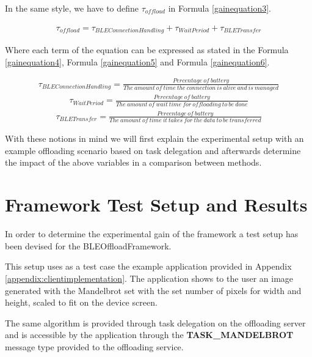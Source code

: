 In the same style, we have to define \(\tau_{offload}\) in Formula \ref{gainequation3}.

\begin{align}\label{gainequation3}
\tau_{offload} = \tau_{BLEConnectionHandling} + \tau_{WaitPeriod} + \tau_{BLETransfer}
\end{align}

Where each term of the equation can be expressed as stated in the Formula \ref{gainequation4}, Formula \ref{gainequation5} and Formula \ref{gainequation6}.

\begin{align}\label{gainequation4}
\tau_{BLEConnectionHandling} = \tfrac{Percentage\ of\ battery}{The\ amount\ of\ time\ the\ connection\ is\ alive\ and\ is\ managed} 
\end{align}
\begin{align}\label{gainequation5}
\tau_{WaitPeriod} = \tfrac{Percentage\ of\ battery}{The\ amount\ of\ wait\ time\ for\ offloading\ to\ be\ done} 
\end{align}
\begin{align}\label{gainequation6}
\tau_{BLETransfer} = \tfrac{Percentage\ of\ battery}{The\ amount\ of\ time\ it\ takes\ for\ the\ data\ to\ be\ transferred}
\end{align}

With these notions in mind we will first explain the experimental setup with an example offloading scenario based on task delegation and afterwards determine the impact of the above variables in a comparison between methods.

\section{Framework Test Setup and Results}

In order to determine the experimental gain of the framework a test setup has been devised for the BLEOffloadFramework. 

This setup uses as a test case the example application provided in Appendix \ref{appendix:clientimplementation}. The application shows to the user an image generated with the Mandelbrot set \cite{mandelbrot2013fractals} with the set number of pixels for width and height, scaled to fit on the device screen.

The same algorithm is provided through task delegation on the offloading server and is accessible by the application through the \textbf{TASK_MANDELBROT} message type provided to the offloading service.

